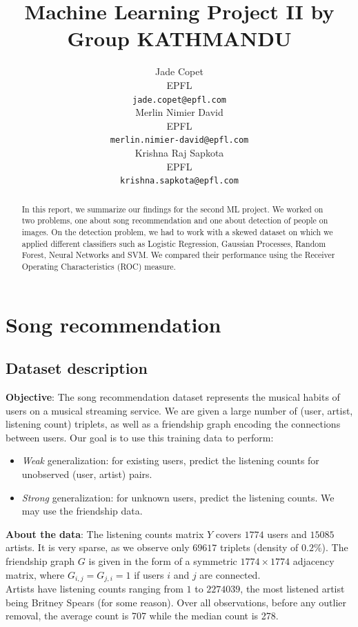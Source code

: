 \documentclass{article}
\title{Machine Learning Project II by Group KATHMANDU}
\author{
  Jade Copet\\
  EPFL \\
  \texttt{jade.copet@epfl.com} \\
  \And
  Merlin Nimier David\\
  EPFL \\
  \texttt{merlin.nimier-david@epfl.com} \\
  \And
  Krishna Raj Sapkota\\
  EPFL \\
  \texttt{krishna.sapkota@epfl.com} \\
}
\begin{document}
\maketitle



\begin{abstract}
 In this report, we summarize our findings for the second ML project. We worked on two problems, one about song recommendation and one about detection of people on images. On the detection problem, we had to work with a skewed dataset on which we applied different classifiers such as Logistic Regression, Gaussian Processes, Random Forest, Neural Networks and SVM. We compared their performance using the Receiver Operating Characteristics (ROC) measure.
\end{abstract}

\section{Song recommendation}

  \subsection{Dataset description}
  \textbf{Objective}: The song recommendation dataset represents the musical habits of users on a musical streaming service. We are given a large number of (user, artist, listening count) triplets, as well as a friendship graph encoding the connections between users. Our goal is to use this training data to perform:

  \begin{itemize}
    \item \textit{Weak} generalization: for existing users, predict the listening counts for unobserved (user, artist) pairs.
    \item \textit{Strong} generalization: for unknown users, predict the listening counts. We may use the friendship data.
  \end{itemize}

  \textbf{About the data}: The listening counts matrix $Y$ covers $1774$ users and $15085$ artists. It is very sparse, as we observe only $69617$ triplets (density of $0.2\%$). The friendship graph $G$ is given in the form of a symmetric $1774 \times 1774$ adjacency matrix, where $G_{i, j} = G_{j, i} = 1$ if users $i$ and $j$ are connected.\\

  Artists have listening counts ranging from $1$ to $2274039$, the most listened artist being Britney Spears (for some reason). Over all observations, before any outlier removal, the average count is 707 while the median count is 278.\\
\end{document}
